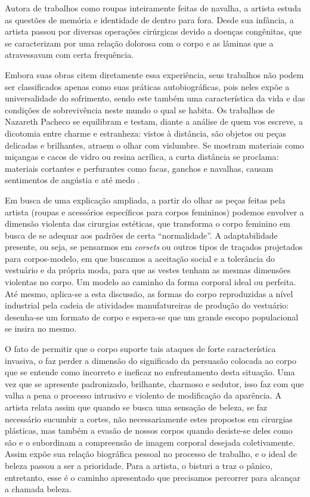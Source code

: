 \begin{refsection}
    Autora de trabalhos como roupas inteiramente feitas de navalha, a artista estuda as questões de memória e identidade de dentro para fora. Desde sua infância, a artista passou por diversas operações cirúrgicas devido a doenças congênitas, que se caracterizam por uma relação dolorosa com o corpo e as lâminas que a atravessavam com certa frequência.	 

    Embora suas obras citem diretamente essa experiência, seus trabalhos não podem ser classificados apenas como suas práticas autobiográficas, pois neles expõe a universalidade do sofrimento, sendo este também uma característica da vida e das condições de sobrevivência neste mundo o qual se habita. Os trabalhos de Nazareth Pacheco se equilibram e testam, diante a análise de quem vos escreve, a dicotomia entre charme e estranheza: vistos à distância, são objetos ou peças delicadas e brilhantes, atraem o olhar com vislumbre. Se mostram materiais como miçangas e cacos de vidro ou resina acrílica, a curta distância se proclama: materiais cortantes e perfurantes como facas, ganchos e navalhas, causam sentimentos de angústia e até medo \cite{Pereira2012Memorias}.

    Em busca de uma explicação ampliada, a partir do olhar as peças feitas pela artista (roupas e acessórios específicos para corpos femininos) podemos envolver a dimensão violenta das cirurgias estéticas, que transforma o corpo feminino em busca de se adequar aos padrões de certa ``normalidade''. A adaptabilidade presente, ou seja, se pensarmos em \textit{corsets} ou outros tipos de traçados projetados para corpos-modelo, em que buscamos a aceitação social e a tolerância do vestuário e da própria moda, para que as vestes tenham as mesmas dimensões violentas no corpo. Um modelo ao caminho da forma corporal ideal ou perfeita. Até mesmo, aplica-se a esta discussão, as formas do corpo reproduzidas a nível industrial pela cadeia de atividades manufatureiras de produção do vestuário: desenha-se um formato de corpo e espera-se que um grande escopo populacional se insira no mesmo. 

    O fato de permitir que o corpo suporte tais ataques de forte característica invasiva, o faz perder a dimensão do significado da persuasão colocada ao corpo que se entende como incorreto e ineficaz no enfrentamento desta situação. Uma vez que se apresente padronizado, brilhante, charmoso e sedutor, isso faz com que valha a pena o processo intrusivo e violento de modificação da aparência. A artista relata assim que quando se busca uma sensação de beleza, se faz necessário sucumbir a cortes, não necessariamente estes propostos em cirurgias plásticas, mas também a evasão de nossos corpos quando desiste-se deles como são e o subordinam a compreensão de imagem corporal desejada coletivamente. Assim expõe sua relação biográfica pessoal no processo de trabalho, e o ideal de beleza passou a ser a prioridade. Para a artista, o bisturi a traz o pânico, entretanto, esse é o caminho apresentado que precisamos percorrer para alcançar a chamada beleza. 


\end{refsection}
